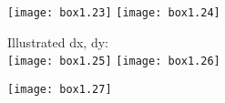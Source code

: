 \documentclass{article}
\begin{document}
\texttt{[image: box1.23]}
\texttt{[image: box1.24]}

\pagebreak
Illustrated dx, dy:\\
\texttt{[image: box1.25]}
\pagebreak
\texttt{[image: box1.26]}

\pagebreak
\texttt{[image: box1.27]}
\end{document}
